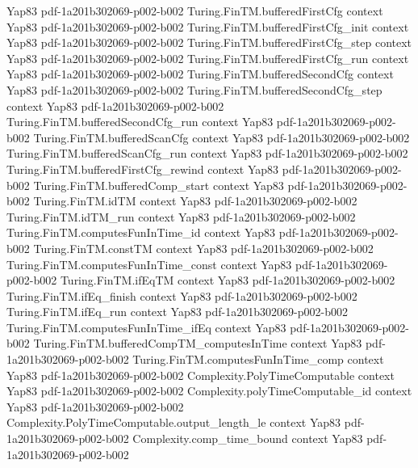 \begin{theorem}
  {Yap83}
  {pdf-1a201b302069-p002-b002}
\proofstep
  {Turing.FinTM.bufferedFirstCfg}
  {context}
  {Yap83}
  {pdf-1a201b302069-p002-b002}
\proofstep
  {Turing.FinTM.bufferedFirstCfg_init}
  {context}
  {Yap83}
  {pdf-1a201b302069-p002-b002}
\proofstep
  {Turing.FinTM.bufferedFirstCfg_step}
  {context}
  {Yap83}
  {pdf-1a201b302069-p002-b002}
\proofstep
  {Turing.FinTM.bufferedFirstCfg_run}
  {context}
  {Yap83}
  {pdf-1a201b302069-p002-b002}
\proofstep
  {Turing.FinTM.bufferedSecondCfg}
  {context}
  {Yap83}
  {pdf-1a201b302069-p002-b002}
\proofstep
  {Turing.FinTM.bufferedSecondCfg_step}
  {context}
  {Yap83}
  {pdf-1a201b302069-p002-b002}
\proofstep
  {Turing.FinTM.bufferedSecondCfg_run}
  {context}
  {Yap83}
  {pdf-1a201b302069-p002-b002}
\proofstep
  {Turing.FinTM.bufferedScanCfg}
  {context}
  {Yap83}
  {pdf-1a201b302069-p002-b002}
\proofstep
  {Turing.FinTM.bufferedScanCfg_run}
  {context}
  {Yap83}
  {pdf-1a201b302069-p002-b002}
\proofstep
  {Turing.FinTM.bufferedFirstCfg_rewind}
  {context}
  {Yap83}
  {pdf-1a201b302069-p002-b002}
\proofstep
  {Turing.FinTM.bufferedComp_start}
  {context}
  {Yap83}
  {pdf-1a201b302069-p002-b002}
\proofstep
  {Turing.FinTM.idTM}
  {context}
  {Yap83}
  {pdf-1a201b302069-p002-b002}
\proofstep
  {Turing.FinTM.idTM_run}
  {context}
  {Yap83}
  {pdf-1a201b302069-p002-b002}
\proofstep
  {Turing.FinTM.computesFunInTime_id}
  {context}
  {Yap83}
  {pdf-1a201b302069-p002-b002}
\proofstep
  {Turing.FinTM.constTM}
  {context}
  {Yap83}
  {pdf-1a201b302069-p002-b002}
\proofstep
  {Turing.FinTM.computesFunInTime_const}
  {context}
  {Yap83}
  {pdf-1a201b302069-p002-b002}
\proofstep
  {Turing.FinTM.ifEqTM}
  {context}
  {Yap83}
  {pdf-1a201b302069-p002-b002}
\proofstep
  {Turing.FinTM.ifEq_finish}
  {context}
  {Yap83}
  {pdf-1a201b302069-p002-b002}
\proofstep
  {Turing.FinTM.ifEq_run}
  {context}
  {Yap83}
  {pdf-1a201b302069-p002-b002}
\proofstep
  {Turing.FinTM.computesFunInTime_ifEq}
  {context}
  {Yap83}
  {pdf-1a201b302069-p002-b002}
\proofstep
  {Turing.FinTM.bufferedCompTM_computesInTime}
  {context}
  {Yap83}
  {pdf-1a201b302069-p002-b002}
\proofstep
  {Turing.FinTM.computesFunInTime_comp}
  {context}
  {Yap83}
  {pdf-1a201b302069-p002-b002}
\proofstep
  {Complexity.PolyTimeComputable}
  {context}
  {Yap83}
  {pdf-1a201b302069-p002-b002}
\proofstep
  {Complexity.polyTimeComputable_id}
  {context}
  {Yap83}
  {pdf-1a201b302069-p002-b002}
\proofstep
  {Complexity.PolyTimeComputable.output_length_le}
  {context}
  {Yap83}
  {pdf-1a201b302069-p002-b002}
\proofstep
  {Complexity.comp_time_bound}
  {context}
  {Yap83}
  {pdf-1a201b302069-p002-b002}

\end{theorem}

